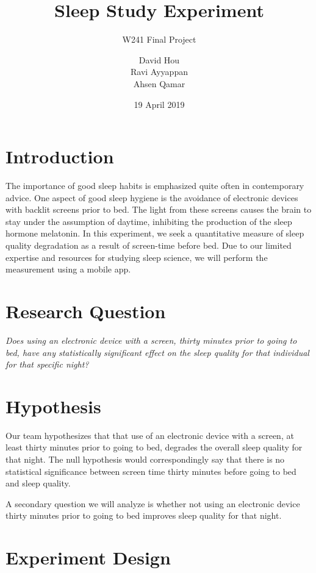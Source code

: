 \documentclass[12pt,]{article}
\title{Sleep Study Experiment}
\subtitle{W241 Final Project}
\author{David Hou \\ Ravi Ayyappan \\ Ahsen Qamar}
\date{19 April 2019}
\begin{document}
\maketitle

\section{Introduction}\label{introduction}

The importance of good sleep habits is emphasized quite often in
contemporary advice. One aspect of good sleep hygiene is the avoidance
of electronic devices with backlit screens prior to bed. The light from
these screens causes the brain to stay under the assumption of daytime,
inhibiting the production of the sleep hormone melatonin. In this
experiment, we seek a quantitative measure of sleep quality degradation
as a result of screen-time before bed. Due to our limited expertise and
resources for studying sleep science, we will perform the measurement
using a mobile app.

\section{Research Question}\label{research-question}

\emph{Does using an electronic device with a screen, thirty minutes
prior to going to bed, have any statistically significant effect on the
sleep quality for that individual for that specific night?}

\section{Hypothesis}\label{hypothesis}

Our team hypothesizes that that use of an electronic device with a
screen, at least thirty minutes prior to going to bed, degrades the
overall sleep quality for that night. The null hypothesis would
correspondingly say that there is no statistical significance between
screen time thirty minutes before going to bed and sleep quality.

A secondary question we will analyze is whether not using an electronic
device thirty minutes prior to going to bed improves sleep quality for
that night.

\section{Experiment Design}\label{experiment-design}
\end{document}
